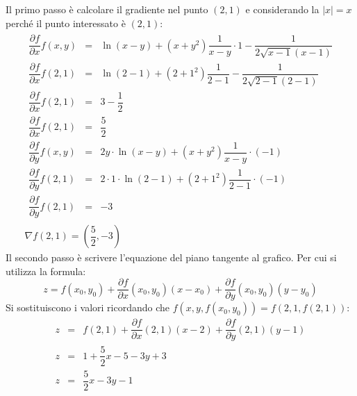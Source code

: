 \documentclass[a4paper]{article}
\begin{document}
	\noindent
	Il primo passo è calcolare il gradiente nel punto $\left(2,1\right)$ e considerando la $\left|x\right| = x$ perché il punto interessato è $\left(2,1\right)$:
	\begin{gather*}
		\begin{array}{rcl}
			\dfrac{\partial f}{\partial x} f\left(x,y\right) &=& \ln\left(x-y\right) + \left(x+y^{2}\right) \dfrac{1}{x-y} \cdot 1 - \dfrac{1}{2\sqrt{x-1}\left(x-1\right)} \\ [1em]
			\dfrac{\partial f}{\partial x} f\left(2,1\right) &=& \ln\left(2-1\right) + \left(2+1^{2}\right) \dfrac{1}{2-1} - \dfrac{1}{2\sqrt{2-1}\left(2-1\right)} \\ [1em]
			\dfrac{\partial f}{\partial x} f\left(2,1\right) &=& 3 - \dfrac{1}{2} \\ [1em]
			\dfrac{\partial f}{\partial x} f\left(2,1\right) &=& \dfrac{5}{2} \\ [2em]
			\dfrac{\partial f}{\partial y} f\left(x,y\right) &=& 2y \cdot \ln\left(x-y\right) + \left(x+y^{2}\right) \dfrac{1}{x-y} \cdot \left(-1\right) \\ [1em]
			\dfrac{\partial f}{\partial y} f\left(2,1\right) &=& 2 \cdot 1 \cdot \ln\left(2-1\right) + \left(2+1^{2}\right) \dfrac{1}{2-1} \cdot \left(-1\right) \\ [1em]
			\dfrac{\partial f}{\partial y} f\left(2,1\right) &=& -3
		\end{array} \\
		\nabla f\left(2,1\right) = \left(\dfrac{5}{2}, -3\right)
	\end{gather*}
	Il secondo passo è scrivere l'equazione del piano tangente al grafico. Per cui si utilizza la formula:
	\begin{equation*}
		z = f\left(x_{0}, y_{0}\right) + \dfrac{\partial f}{\partial x}\left(x_{0},y_{0}\right)\left(x-x_{0}\right) + \dfrac{\partial f}{\partial y}\left(x_{0},y_{0}\right)\left(y-y_{0}\right)
	\end{equation*}
	Si sostituiscono i valori ricordando che $f\left(x,y,f\left(x_{0},y_{0}\right)\right) = f\left(2,1,f\left(2,1\right)\right)$:
	\begin{equation*}
		\begin{array}{rcl}
			z &=& f\left(2, 1\right) + \dfrac{\partial f}{\partial x}\left(2,1\right)\left(x-2\right) + \dfrac{\partial f}{\partial y}\left(2,1\right)\left(y-1\right) \\ [1em]
			z &=& 1 + \dfrac{5}{2}x -5 -3y +3 \\ [1em]
			z &=& \dfrac{5}{2}x - 3y -1
		\end{array}
	\end{equation*}\newpage
\end{document}

